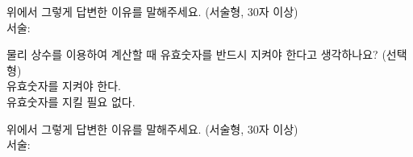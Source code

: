 \begin{graybox}\vspace*{0.2em}\bn
위에서 그렇게 답변한 이유를 말해주세요.
(서술형, 30자 이상) \\ 서술: 
\vspace*{2.4em}\end{graybox}\vspace{0.4em}

\begin{graybox}\vspace*{0.2em}\bn
물리 상수를 이용하여 계산할 때 유효숫자를 반드시 지켜야 한다고 생각하나요?
(선택형) \\
\raisebox{-0.25ex}{\scalebox{1.4}{$\Box$}} 유효숫자를 지켜야 한다. \\
\raisebox{-0.25ex}{\scalebox{1.4}{$\Box$}} 유효숫자를 지킬 필요 없다.
\vspace*{0.4em}\end{graybox}\vspace{0.4em}

\begin{graybox}\vspace*{0.2em}\bn
위에서 그렇게 답변한 이유를 말해주세요.
(서술형, 30자 이상) \\ 서술: 
\vspace*{2.4em}\end{graybox}\vspace{0.4em}